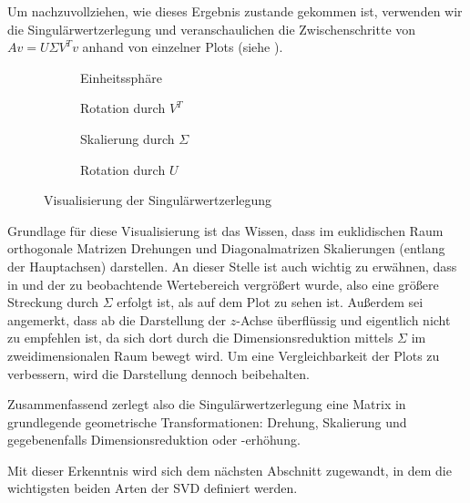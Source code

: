 Um nachzuvollziehen, wie dieses Ergebnis zustande gekommen ist, verwenden wir die Singulärwertzerlegung und veranschaulichen die Zwischenschritte von \(Av = U \Sigma V^{T}v\) anhand von einzelner Plots (siehe ). 
\begin{figure}[t]
    \centering
    \captionsetup[subfigure]{justification=centering}
    \begin{subfigure}{0.45\textwidth}
        \centering
        \caption{Einheitssphäre}\label{fig:svspha}
        
    \end{subfigure}
    \begin{subfigure}{0.45\textwidth}
        \centering
        \caption{Rotation durch \(V^{T}\)}\label{fig:svsphb}
        
    \end{subfigure}
    \begin{subfigure}{0.45\textwidth}
        \centering
        \caption{Skalierung durch \(\Sigma\)}\label{fig:svdsphc}
        
    \end{subfigure}
    \begin{subfigure}{0.45\textwidth}
        \centering
        \caption{Rotation durch \(U\)}\label{fig:svdsphd}
        
    \end{subfigure}
    \caption{Visualisierung der Singulärwertzerlegung}\label{fig:svdsph}
\end{figure}

Grundlage für diese Visualisierung ist das Wissen, dass im euklidischen Raum orthogonale Matrizen Drehungen und Diagonalmatrizen Skalierungen (entlang der Hauptachsen) darstellen.
An dieser Stelle ist auch wichtig zu erwähnen, dass in  und  der zu beobachtende Wertebereich vergrößert wurde, also eine größere Streckung durch \(\Sigma\) erfolgt ist, als auf dem Plot zu sehen ist.
Außerdem sei angemerkt, dass ab  die Darstellung der \(z\)-Achse überflüssig und eigentlich nicht zu empfehlen ist, da sich dort durch die Dimensionsreduktion mittels \(\Sigma\) im zweidimensionalen Raum bewegt wird.
Um eine Vergleichbarkeit der Plots zu verbessern, wird die Darstellung dennoch beibehalten.  

Zusammenfassend zerlegt also die Singulärwertzerlegung eine Matrix in grundlegende geometrische Transformationen: Drehung, Skalierung und gegebenenfalls Dimensionsreduktion oder -erhöhung.

Mit dieser Erkenntnis wird sich dem nächsten Abschnitt zugewandt, in dem die wichtigsten beiden Arten der SVD definiert werden.

